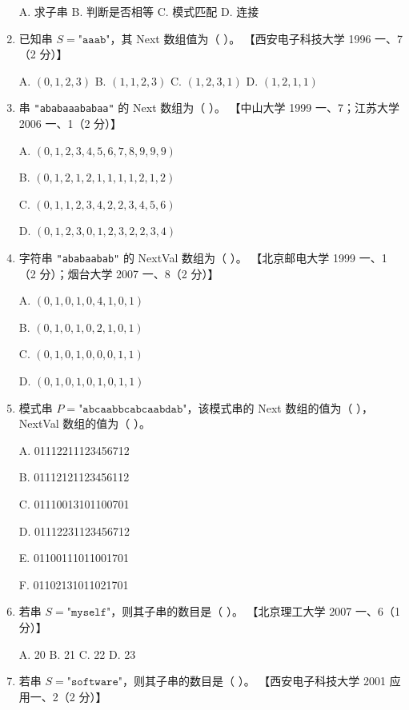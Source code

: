 \documentclass[lang=cn,newtx,10pt,scheme=chinese]{elegantbook}
\begin{document}
\begin{enumerate}
    A. 求子串 \quad B. 判断是否相等 \quad C. 模式匹配 \quad D. 连接  

    \item 已知串 $S = \texttt{"aaab"}$，其 Next 数组值为（ ）。  
    【西安电子科技大学 1996 一、7（2 分）】 

    A. $(0, 1, 2, 3)$ \quad B. $(1, 1, 2, 3)$ \quad C. $(1, 2, 3, 1)$ \quad D. $(1, 2, 1, 1)$  

    \item 串 \texttt{"ababaaababaa"} 的 Next 数组为（ ）。  
    【中山大学 1999 一、7；江苏大学 2006 一、1（2 分）】  

    A. $(0, 1, 2, 3, 4, 5, 6, 7, 8,9,9,9)$  

    B. $(0, 1, 2, 1, 2, 1, 1, 1, 1,2,1,2)$  

    C. $(0, 1, 1, 2, 3, 4, 2, 2, 3,4,5,6)$  

    D. $(0, 1, 2, 3, 0, 1, 2, 3, 2,2,3,4)$  

    \item 字符串 \texttt{"ababaabab"} 的 NextVal 数组为（ ）。  
    【北京邮电大学 1999 一、1（2 分）；烟台大学 2007 一、8（2 分）】  

    A. $(0, 1, 0, 1, 0, 4, 1, 0, 1)$  

    B. $(0, 1, 0, 1, 0, 2, 1, 0, 1)$  

    C. $(0, 1, 0, 1, 0, 0, 0, 1, 1)$  

    D. $(0, 1, 0, 1, 0, 1, 0, 1, 1)$  

    \item 模式串 $P = \texttt{"abcaabbcabcaabdab"}$，该模式串的 Next 数组的值为（ ），NextVal 数组的值为（ ）。  
    
    A. 01112211123456712 

    B. 01112121123456112 

    C. 01110013101100701 

    D. 01112231123456712 

    E. 01100111011001701 

    F. 01102131011021701  

       \item 若串 $S = \texttt{"myself"}$，则其子串的数目是（ ）。  
       【北京理工大学 2007 一、6（1 分）】  

       A. 20 \quad B. 21 \quad C. 22 \quad D. 23  
   
       \item 若串 $S = \texttt{"software"}$，则其子串的数目是（ ）。  
       【西安电子科技大学 2001 应用一、2（2 分）】  


\end{enumerate}
\end{document}
